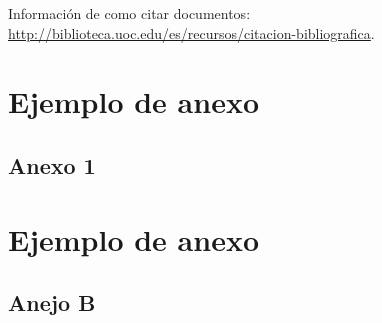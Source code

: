 \documentclass[IB,BIB]{TFUOC}%
\begin{document}
Información de como citar documentos: \url{http://biblioteca.uoc.edu/es/recursos/citacion-bibliografica}.


\newpage
\appendix
 

\chapter{Ejemplo de anexo}

\section{Anexo 1}


\chapter{Ejemplo de anexo}

\section{Anejo B}
\end{document}

